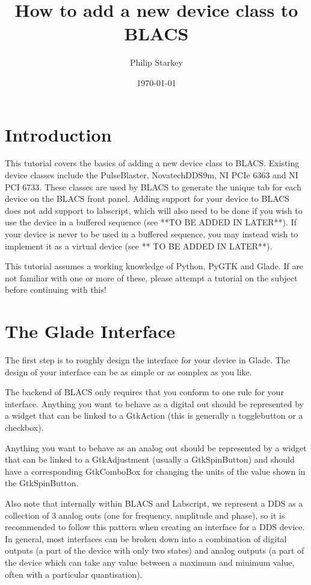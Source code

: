 \documentclass[12pt]{article}
\begin{document}
\title{How to add a new device class to BLACS}
\author{Philip Starkey}
\date{\today}
\maketitle
{}
\section{Introduction}
This tutorial covers the basics of adding a new device class to BLACS. Existing device classes include the PulseBlaster, NovatechDDS9m, NI PCIe 6363 and NI PCI 6733. These classes are used by BLACS to generate the unique tab for each device on the BLACS front panel. Adding support for your device to BLACS does not add support to labscript, which will also need to be done if you wish to use the device in a buffered sequence (see **TO BE ADDED IN LATER**). If your device is never to be used in a buffered sequence, you may instead wish to implement it as a virtual device (see ** TO BE ADDED IN LATER**).

This tutorial assumes a working knowledge of Python, PyGTK and Glade. If are not familiar with one or more of these, please attempt a tutorial on the subject before continuing with this!

\section{The Glade Interface}\label{glade interface}
The first step is to roughly design the interface for your device in Glade. The design of your interface can be as simple or as complex as you like. 

The backend of BLACS only requires that you conform to one rule for your interface. Anything you want to behave as a digital out should be represented by a widget that can be linked to a GtkAction (this is generally a togglebutton or a checkbox).

Anything you want to behave as an analog out should be represented by a widget that can be linked to a GtkAdjustment (usually a GtkSpinButton) and should have a corresponding GtkComboBox for changing the units of the value shown in the GtkSpinButton.

Also note that internally within BLACS and Labscript, we represent a DDS as a collection of 3 analog outs (one for frequency, amplitude and phase), so it is recommended to follow this pattern when creating an interface for a DDS device. In general, most interfaces can be broken down into a combination of digital outputs (a part of the device with only two states) and analog outputs (a part of the device which can take any value between a maximum and minimum value, often with a particular quantisation).
\end{document}

